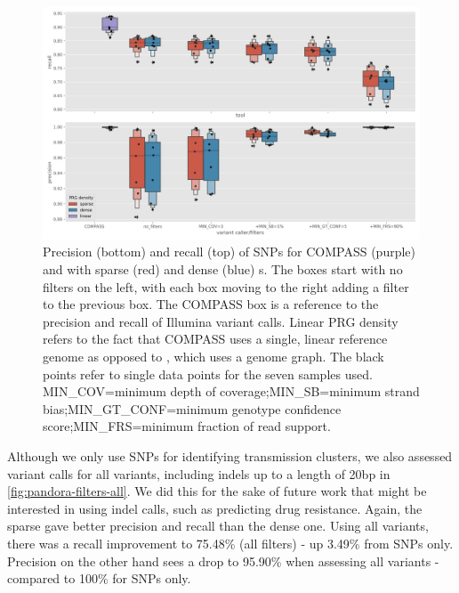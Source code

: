 \begin{figure}
\begin{center}
\includegraphics[width=0.70\columnwidth]{Chapter2/Figs/pandora-precision-recall-filters-snps.png}
\caption{{Precision (bottom) and recall (top) of SNPs for COMPASS (purple) and \pandora{} with sparse (red) and dense (blue) \prg{}s. The \pandora{} boxes start with no filters on the left, with each box moving to the right adding a filter to the previous box. The COMPASS box is a reference to the precision and recall of Illumina variant calls. Linear PRG density refers to the fact that COMPASS uses a single, linear reference genome as opposed to \pandora{}, which uses a genome graph. The black points refer to single data points for the seven samples used. MIN\_COV=minimum depth of coverage;MIN\_SB=minimum strand bias;MIN\_GT\_CONF=minimum genotype confidence score;MIN\_FRS=minimum fraction of read support.
{\label{fig:pandora-filters-snps}}%
}}
\end{center}
\end{figure}


Although we only use SNPs for identifying transmission clusters, we also assessed \pandora{} variant calls for all variants, including indels up to a length of 20bp in \autoref{fig:pandora-filters-all}.  We did this for the sake of future work that might be interested in using \pandora{} indel calls, such as predicting drug resistance. Again, the sparse \prg{} gave better precision and recall than the dense one. Using all variants, there was a recall improvement to 75.48\% (all filters) - up 3.49\% from SNPs only. Precision on the other hand sees a drop to 95.90\% when assessing all variants - compared to 100\% for SNPs only.

